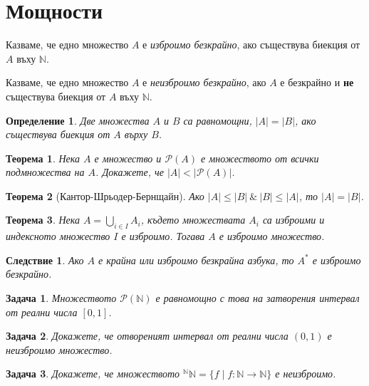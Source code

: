 \documentclass[a4paper]{article}
\newtheorem{thm}{Теорема}
\newtheorem{corollary}{Следствие}
\newtheorem{dfn}{Определение}
\newtheorem{problem}{Задача}
\newcommand{\Ps}{\mathscr{P}}
\newcommand{\N}{\mathbb{N}}
\begin{document}
\author{Stefan Vatev}

\section{Мощности}


Казваме, че едно множество $A$ е {\em изброимо безкрайно}, ако съществува 
биекция от $A$ въху $\N$.

Казваме, че едно множество $A$ е {\em неизброимо безкрайно}, ако $A$ е безкрайно и {\bf не} съществува 
биекция от $A$ въху $\N$.

\begin{dfn}
  Две множества $A$ и $B$ са равномощни, $|A| = |B|$, ако съществува биекция от $A$ върху $B$.
\end{dfn}

\begin{thm}
  Нека $A$ е множество и $\Ps(A)$ е множеството от всички подмножества на $A$.
  Докажете, че $|A| < |\Ps(A)|$.
\end{thm}


\begin{thm}[Кантор-Шрьодер-Бернщайн]\label{KSB}
  Ако $|A|\leq|B|\ \&\ |B|\leq|A|$, то $|A| = |B|$.
\end{thm}

\begin{thm}\label{countable_union}
  Нека $A = \bigcup_{i\in I}A_i$, където множествата $A_i$ са изброими и индексното множество $I$ е изброимо.
  Тогава $A$ е изброимо множество.
\end{thm}
\begin{corollary}
  Ако $A$ е крайна или изброимо безкрайна азбука, то $A^*$ е изброимо безкрайно.
\end{corollary}

\begin{problem}
  Множеството $\Ps(\N)$ е равномощно с това на затворения интервал от реални числа $[0,1]$.
\end{problem}

\begin{problem}
  Докажете, че отвореният интервал от реални числа $(0,1)$ е неизброимо множество.
\end{problem}

\begin{problem}
  Докажете, че множеството $^\N\N = \{f\mid f:\N\to\N\}$ е неизброимо.
\end{problem}
\end{document}
